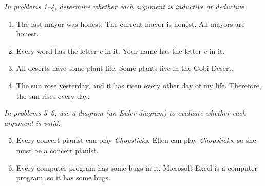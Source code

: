\emph{In problems 1--4, determine whether each argument is inductive or deductive.}
\begin{enumerate}

\item The last mayor was honest.  The current mayor is honest.  All mayors are honest. 

\item Every word has the letter \emph{e} in it.  Your name has the letter \emph{e} in it. 

\item All deserts have some plant life.  Some plants live in the Gobi Desert. 

\item The sun rose yesterday, and it has risen every other day of my life.  Therefore, the sun rises every day. 
\end{enumerate}

\emph{In problems 5--6, use a diagram (an Euler diagram) to evaluate whether each argument is valid.}
\begin{enumerate}
\setcounter{enumi}{4}

\item Every concert pianist can play \emph{Chopsticks}.  Ellen can play \emph{Chopsticks}, so she must be a concert pianist. 

\item Every computer program has some bugs in it.  Microsoft Excel is a computer program, so it has some bugs. 
\end{enumerate}
\pagebreak

